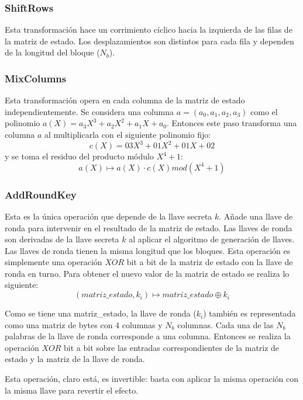 \subsubsection{ShiftRows}
Esta transformación hace un corrimiento cíclico hacia la izquierda de las
filas de la matriz de estado. Los desplazamientos son distintos para cada
fila y dependen de la longitud del bloque ($N_b$).

\subsubsection{MixColumns}
Esta transformación opera en cada columna de la matriz de estado
independientemente. Se considera una columna $a = (a_0, a_1, a_2, a_3)$
como el polinomio $a(X) = a_3X^3 + a_2X^2 + a_1X + a_0$.
Entonces este paso transforma una columna $a$ al multiplicarla con el
siguiente polinomio fijo:
\begin{equation}
  \label{cifrado_aes_poli}
 	c(X) = 03X^3 + 01X^2 + 01X+ 02
\end{equation}
y se toma el residuo del producto módulo $X^4+1$:
\begin{equation}
  \label{cifrado_aes_mix}
 	a(X) \mapsto a(X) \cdotp c(X) mod (X^4+1)
\end{equation}

\subsubsection{AddRoundKey}
Esta es la única operación que depende de la llave secreta $k$. Añade una
llave de ronda para intervenir en el resultado de la matriz de estado.
Las llaves de ronda son derivadas de la llave secreta $k$ al aplicar el
algoritmo de generación de llaves. Las llaves de ronda tienen la misma
longitud que los bloques. Esta operación es simplemente una operación
$XOR$ bit a bit de la matriz de estado con la llave de ronda en turno.
Para obtener el nuevo valor de la matriz de estado se realiza lo
siguiente:
\begin{equation}
  \label{cifrado_aes_addkey}
 	(matriz\_estado, k_i) \mapsto matriz\_estado \oplus k_i
\end{equation}

Como se tiene una matriz\_estado, la llave de ronda ($k_i$) también
es representada como una matriz de bytes con 4 columnas y $N_b$ columnas.
Cada una de las $N_b$ palabras de la llave de ronda corresponde a una
columna. Entonces se realiza la operación $XOR$ bit a bit sobre las
entradas correspondientes de la matriz de estado y la matriz de la llave
de ronda.

Esta operación, claro está, es invertible: basta con aplicar la misma
operación con la misma llave para revertir el efecto.
